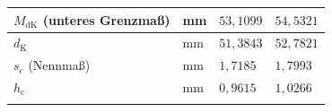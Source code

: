 \begin{table}[htbp]
\begin{tabular}{L{6.2cm}lll}
        \hline
        $M_{\mathrm{dK}}$ (unteres Grenzmaß) & mm & $53{,}1099$ & $54{,}5321$ \\
        \hline
        $d_{\mathrm{K}}$ & mm & $51{,}3843$ & $52{,}7821$ \\
        \hline
        $s_{\mathrm{c}}$ (Nennmaß) & mm & $1{,}7185$ & $1{,}7993$ \\
        \hline
        $h_{\mathrm{c}}$ & mm & $0{,}9615$ & $1{,}0266$ \\
        \hline
    \end{tabular}
\end{table}
